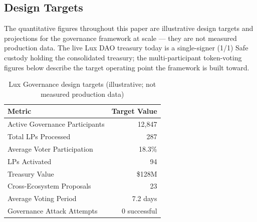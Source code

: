 \subsection{Design Targets}

The quantitative figures throughout this paper are illustrative design targets
and projections for the governance framework at scale --- they are not measured
production data. The live Lux DAO treasury today is a single-signer (1/1) Safe
custody holding the consolidated treasury; the multi-participant token-voting
figures below describe the target operating point the framework is built toward.

\begin{table}[h]
\centering
\begin{tabular}{@{}lr@{}}
\toprule
\textbf{Metric} & \textbf{Target Value} \\ \midrule
Active Governance Participants & 12,847 \\
Total LPs Processed & 287 \\
Average Voter Participation & 18.3\% \\
LPs Activated & 94 \\
Treasury Value & \$128M \\
Cross-Ecosystem Proposals & 23 \\
Average Voting Period & 7.2 days \\
Governance Attack Attempts & 0 successful \\ \bottomrule
\end{tabular}
\caption{Lux Governance design targets (illustrative; not measured production data)}
\end{table}

